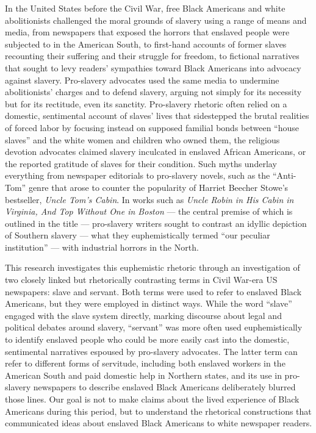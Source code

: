 \documentclass[11pt]{article}
\begin{document}
In the United States before the Civil War, free Black Americans and white abolitionists challenged the moral grounds of slavery using a range of means and media, from newspapers that exposed the horrors that enslaved people were subjected to in the American South, to first-hand accounts of former slaves recounting their suffering and their struggle for freedom, to fictional narratives that sought to levy readers’ sympathies toward Black Americans into 
advocacy against slavery. 
Pro-slavery advocates used the same media to undermine abolitionists’ charges and to defend slavery, arguing not simply for its necessity but for its rectitude, even its sanctity. 
Pro-slavery rhetoric often relied on a domestic, sentimental account of slaves’ lives that sidestepped the brutal realities of forced labor by focusing instead on supposed familial bonds between ``house slaves'' and the white women and children who owned them, the religious devotion advocates claimed slavery inculcated in enslaved African Americans, or the reported gratitude of slaves for their condition. 
Such myths underlay everything from newspaper editorials to pro-slavery novels, such as the ``Anti-Tom'' genre that arose to counter the popularity of Harriet Beecher Stowe’s bestseller, \textit{Uncle Tom’s Cabin}. 
In works such as \textit{Uncle Robin in His Cabin in Virginia, And Top Without One in Boston} — the central premise of which is outlined in the title — pro-slavery writers sought to contrast an idyllic depiction of Southern slavery 
— what they euphemistically termed ``our peculiar institution'' — with industrial horrors in the North. 

This research investigates this euphemistic rhetoric through an investigation of two closely linked but rhetorically contrasting terms in Civil War-era US newspapers: slave and servant. Both terms were used to refer to enslaved Black Americans, but they were employed in distinct ways. 
While the word ``slave'' engaged with the slave system directly, marking discourse about legal and political debates around slavery, ``servant'' was more often used euphemistically to identify enslaved people who could be more easily cast into the domestic, sentimental narratives espoused by pro-slavery advocates. 
The latter term can refer to different forms of servitude, including both enslaved workers in the American South and paid domestic help in Northern states, and its use in pro-slavery newspapers to describe enslaved Black Americans deliberately blurred those lines. 
Our goal is not to make claims about the lived experience of Black Americans during this period, but to understand the rhetorical constructions that communicated ideas about enslaved Black Americans to white newspaper readers. 
\end{document}
